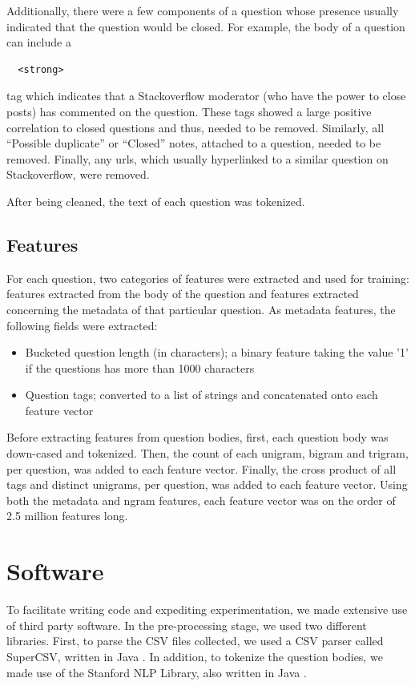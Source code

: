 \documentclass[11pt]{article}
\begin{document}
Additionally, there were a few components of a question whose presence
usually indicated that the question would be closed.  For example, the
body of a question can include a \begin{verbatim}
  <strong> \end{verbatim} tag which indicates that a Stackoverflow
moderator (who have the power to close posts) has commented on the
question. These tags showed a large positive correlation to closed
questions and thus, needed to be removed. Similarly, all ``Possible
duplicate'' or ``Closed'' notes, attached to a question, needed to be
removed.  Finally, any urls, which usually hyperlinked to a similar
question on Stackoverflow, were removed.

After being cleaned, the text of each question was tokenized.

\subsection{Features}

For each question, two categories of features were extracted and used
for training: features extracted from the body of the question and
features extracted concerning the metadata of that particular
question. As metadata features, the following fields were extracted:

\begin{itemize}
  \item Bucketed question length (in characters); a binary feature
    taking the value '1' if the questions has more than 1000 characters
  \item Question tags; converted to a list of strings and concatenated
    onto each feature vector
\end{itemize}

Before extracting features from question bodies, first, each question
body was down-cased and tokenized. Then, the count of each unigram, bigram and
trigram, per question, was added to each feature vector. Finally, the
cross product of all tags and distinct unigrams, per question, was
added to each feature vector.  Using both the metadata and ngram
features, each feature vector was on the order of 2.5 million features
long.

\section{Software}

To facilitate writing code and expediting experimentation, we made
extensive use of third party software. In the pre-processing stage, we
used two different libraries.  First, to parse the CSV files
collected, we used a CSV parser called SuperCSV, written in Java
\cite{website:supercsv}. In addition, to tokenize the question bodies,
we made use of the Stanford NLP Library, also written in Java
\cite{stanfordnlp}.
\end{document}
